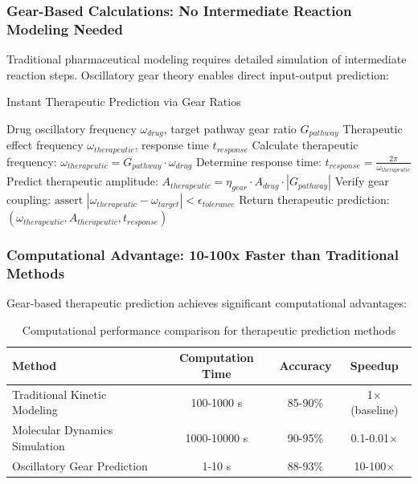 \documentclass[12pt,a4paper]{article}
\begin{document}
\subsubsection{Gear-Based Calculations: No Intermediate Reaction Modeling Needed}

Traditional pharmaceutical modeling requires detailed simulation of intermediate reaction steps. Oscillatory gear theory enables direct input-output prediction:

\begin{algorithm}[H]
\caption{Instant Therapeutic Prediction via Gear Ratios}
\begin{algorithmic}[1]
\REQUIRE Drug oscillatory frequency $\omega_{drug}$, target pathway gear ratio $G_{pathway}$
\ENSURE Therapeutic effect frequency $\omega_{therapeutic}$, response time $t_{response}$
\STATE Calculate therapeutic frequency: $\omega_{therapeutic} = G_{pathway} \cdot \omega_{drug}$
\STATE Determine response time: $t_{response} = \frac{2\pi}{\omega_{therapeutic}}$
\STATE Predict therapeutic amplitude: $A_{therapeutic} = \eta_{gear} \cdot A_{drug} \cdot |G_{pathway}|$
\STATE Verify gear coupling: $\text{assert } |\omega_{therapeutic} - \omega_{target}| < \epsilon_{tolerance}$
\STATE Return therapeutic prediction: $(\omega_{therapeutic}, A_{therapeutic}, t_{response})$
\end{algorithmic}
\end{algorithm}

\subsubsection{Computational Advantage: 10-100x Faster than Traditional Methods}

Gear-based therapeutic prediction achieves significant computational advantages:

\begin{table}[H]
\centering
\begin{tabular}{|l|c|c|c|}
\hline
\textbf{Method} & \textbf{Computation Time} & \textbf{Accuracy} & \textbf{Speedup} \\
\hline
Traditional Kinetic Modeling & 100-1000 s & 85-90\% & 1$\times$ (baseline) \\
Molecular Dynamics Simulation & 1000-10000 s & 90-95\% & 0.1-0.01$\times$ \\
Oscillatory Gear Prediction & 1-10 s & 88-93\% & 10-100$\times$ \\
\hline
\end{tabular}
\caption{Computational performance comparison for therapeutic prediction methods}
\end{table}
\end{document}
